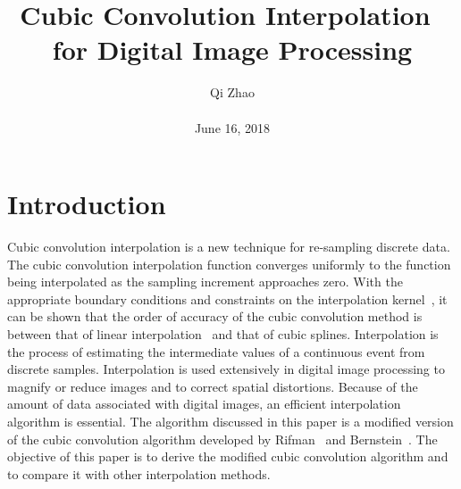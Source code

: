 \documentclass[10pt,twocolumn,letterpaper]{article}
\begin{document}
\title{Cubic Convolution Interpolation~\cite{meijering2003note} for Digital Image Processing}
\author{Qi Zhao\\\\June 16, 2018}

\maketitle
\section{Introduction}
Cubic convolution interpolation is a new technique for re-sampling discrete data. The cubic convolution interpolation function converges uniformly to the function being interpolated as the sampling increment approaches zero. With the appropriate boundary conditions and constraints on the interpolation kernel~\cite{hanssen1999evaluation}, it can be shown that the order of accuracy of the cubic convolution method is between that of linear interpolation~\cite{powell1994direct} and that of cubic splines. Interpolation is the process of estimating the intermediate values of a continuous event from discrete samples. Interpolation is used extensively in digital image processing to magnify or reduce images and to correct spatial distortions. Because of the amount of data associated with digital images, an efficient interpolation algorithm is essential. The algorithm discussed in this paper is a modified version of the cubic convolution algorithm developed by Rifman~\cite{Rifman1973Digital} and Bernstein~\cite{bernstein1976digital}. The objective of this paper is to derive the modified cubic convolution algorithm and to compare it with other interpolation methods.
\end{document}
